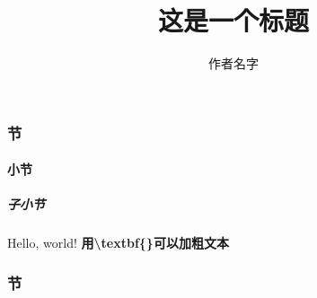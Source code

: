 \documentclass{article}   %
\begin{document}
	\title{这是一个标题}  %
	\author{作者名字}     %
	\date{}  %
	\maketitle  %
	\section{节}
	\subsection{小节}
	\subsubsection{子小节}
	Hello, world!  	%
	\textbf{用\textbackslash textbf\{\}可以加粗文本}  %
	\section{节}
	\part{}
	\part{}
\end{document}
